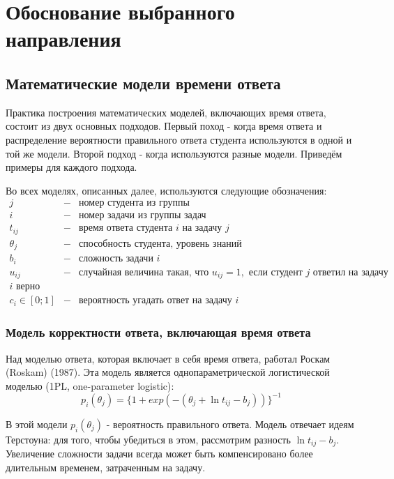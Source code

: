 \chapter{Обоснование выбранного направления}
\label{ch22}
\section{Математические модели времени ответа}

Практика построения математических моделей, включающих время ответа, состоит из двух основных подходов. Первый поход - когда время ответа и распределение вероятности правильного ответа студента используются в одной и той же модели. Второй подход - когда используются разные модели. Приведём примеры для каждого подхода.

Во всех моделях, описанных далее, используются следующие обозначения:
$$
\begin{array}{lll}
j &-& \mbox{номер студента из группы}\\
i &-& \mbox{номер задачи из группы задач}\\
t_{ij} &-& \mbox{время ответа студента } i \mbox{ на задачу } j\\
\theta_j &-& \mbox{способность студента, уровень знаний}\\
b_i &-& \mbox{сложность задачи } i\\
u_{ij} &-& \mbox{случайная величина такая, что } u_{ij} = 1, \mbox{ если студент } j \mbox{ ответил на задачу }\\ i \mbox{ верно}\\
c_i \in [0;1] &-& \mbox{вероятность угадать ответ на задачу } i
\end{array}
$$

\subsection{Модель корректности ответа, включающая время ответа}

Над моделью ответа, которая включает в себя время ответа, работал Роскам (Roskam) (1987). Эта модель является однопараметрической логистической моделью (1PL, one-para\-meter logistic):
\begin{equation}
p_i(\theta_j) = \{1+exp(-(\theta_j + \ln t_{ij} - b_j))\}^{-1}
\end{equation}

В этой модели $p_i(\theta_j)$ - вероятность правильного ответа. Модель отвечает идеям Терсто\-уна: для того, чтобы убедиться в этом, рассмотрим разность $\ln t_{ij} - b_j$. Увеличение сложнос\-ти задачи всегда может быть компенсировано более длительным временем, затра\-ченным на задачу.

